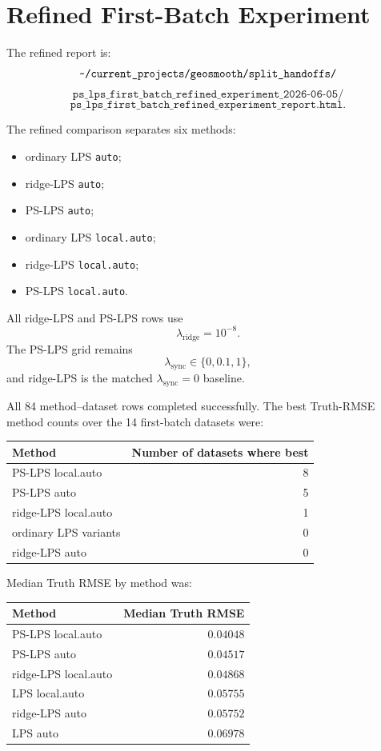 \documentclass[11pt]{article}
\begin{document}
\section{Refined First-Batch Experiment}

The refined report is:
\[
  \texttt{\string~/current\_projects/geosmooth/split\_handoffs/}
\]
\[
  \texttt{ps\_lps\_first\_batch\_refined\_experiment\_2026-06-05/}
\]
\[
  \texttt{ps\_lps\_first\_batch\_refined\_experiment\_report.html}.
\]

The refined comparison separates six methods:
\begin{itemize}[leftmargin=*]
  \item ordinary LPS \texttt{auto};
  \item ridge-LPS \texttt{auto};
  \item PS-LPS \texttt{auto};
  \item ordinary LPS \texttt{local.auto};
  \item ridge-LPS \texttt{local.auto};
  \item PS-LPS \texttt{local.auto}.
\end{itemize}
All ridge-LPS and PS-LPS rows use
\[
  \lambda_{\mathrm{ridge}}=10^{-8}.
\]
The PS-LPS grid remains
\[
  \lambda_{\mathrm{sync}}\in\{0,0.1,1\},
\]
and ridge-LPS is the matched \(\lambda_{\mathrm{sync}}=0\) baseline.

All 84 method--dataset rows completed successfully.  The best Truth-RMSE method
counts over the 14 first-batch datasets were:
\begin{center}
\begin{tabular}{@{}lr@{}}
\toprule
Method & Number of datasets where best \\
\midrule
PS-LPS local.auto & 8 \\
PS-LPS auto & 5 \\
ridge-LPS local.auto & 1 \\
ordinary LPS variants & 0 \\
ridge-LPS auto & 0 \\
\bottomrule
\end{tabular}
\end{center}

Median Truth RMSE by method was:
\begin{center}
\begin{tabular}{@{}lr@{}}
\toprule
Method & Median Truth RMSE \\
\midrule
PS-LPS local.auto & \(0.04048\) \\
PS-LPS auto & \(0.04517\) \\
ridge-LPS local.auto & \(0.04868\) \\
LPS local.auto & \(0.05755\) \\
ridge-LPS auto & \(0.05752\) \\
LPS auto & \(0.06978\) \\
\bottomrule
\end{tabular}
\end{center}
\end{document}
